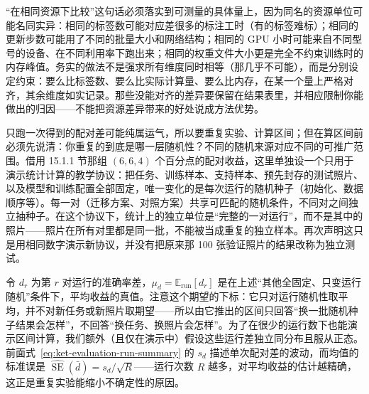 “在相同资源下比较”这句话必须落实到可测量的具体量上，因为同名的资源单位可能名同实异：相同的标签数可能对应差很多的标注工时（有的标签难标）；相同的更新步数可能用了不同的批量大小和网络结构；相同的 GPU 小时可能来自不同型号的设备、在不同利用率下跑出来；相同的权重文件大小更是完全不约束训练时的内存峰值。务实的做法不是强求所有维度同时相等（那几乎不可能），而是分别设定约束：要么比标签数、要么比实际计算量、要么比内存，在某一个量上严格对齐，其余维度如实记录。那些没能对齐的差异要保留在结果表里，并相应限制你能做出的归因——不能把资源差异带来的好处说成方法优势。

只跑一次得到的配对差可能纯属运气，所以要重复实验、计算区间；但在算区间前必须先说清：你重复的到底是哪一层随机性？不同的随机来源对应不同的可推广范围。借用 15.1.1 节那组 $(6,6,4)$ 个百分点的配对收益，这里单独设一个只用于演示统计计算的教学协议：把任务、训练样本、支持样本、预先封存的测试照片、以及模型和训练配置全部固定，唯一变化的是每次运行的随机种子（初始化、数据顺序等）。每一对（迁移方案、对照方案）共享可匹配的随机条件，不同对之间独立抽种子。在这个协议下，统计上的独立单位是“完整的一对运行”，而不是其中的照片——照片在所有对里都是同一批，不能被当成重复的独立样本。再次声明这只是用相同数字演示新协议，并没有把原来那 100 张验证照片的结果改称为独立测试。

令 $d_r$ 为第 $r$ 对运行的准确率差，$\mu_d=\mathbb E_{\mathrm{run}}[d_r]$ 是在上述“其他全固定、只变运行随机”条件下，平均收益的真值。注意这个期望的下标：它只对运行随机性取平均，并不对新任务或新照片取期望——所以由它推出的区间只回答“换一批随机种子结果会怎样”，不回答“换任务、换照片会怎样”。为了在很少的运行数下也能演示区间计算，我们额外（且仅在演示中）假设这些运行差独立同分布且服从正态。前面式~\eqref{eq:ket-evaluation-run-summary} 的 $s_d$ 描述单次配对差的波动，而均值的标准误是 $\widehat{\operatorname{SE}}(\bar d)=s_d/\sqrt R$——运行次数 $R$ 越多，对平均收益的估计越精确，这正是重复实验能缩小不确定性的原因。


